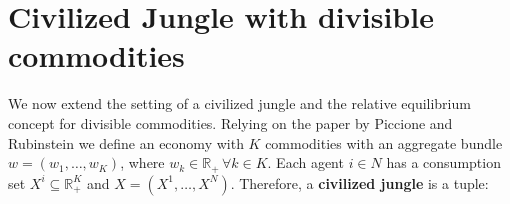 



\section{Civilized Jungle with divisible commodities}
% 
We now extend the setting of a civilized jungle and the relative equilibrium concept for divisible commodities. Relying on the paper by Piccione and Rubinstein \cite[PR]{P-R} we define an economy with $K$ commodities with an aggregate bundle $w=(w_1,\dots,w_K)$, where $w_k\in\mathbb{R}_+\,\forall k\in K$. Each agent $i\in N$ has a consumption set $X^i\subseteq\mathbb{R}_+^K$ and $X=(X^1,\dots,X^N)$. Therefore, a \textbf{civilized jungle} is a tuple:


